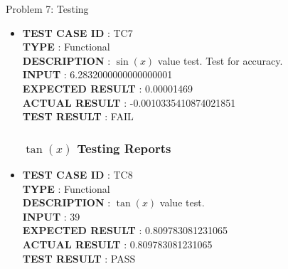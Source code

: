 \documentclass[a4paper,12pt]{article}
\begin{document}
\begin{section}{Problem 7: Testing}
\begin{itemize}
\item \textbf{TEST CASE ID} \hspace{1.25cm} : TC7  \\
\textbf{TYPE } \hspace{3.15cm}  : Functional\\
\textbf{DESCRIPTION }\hspace{1.25cm} : $\sin(x)$ value test. Test for accuracy. \\
\textbf{INPUT} \hspace{3.05cm} :  6.2832000000000000001 \\
\textbf{EXPECTED RESULT} \hspace{0.01cm} : 0.00001469 \\
\textbf{ACTUAL RESULT} \hspace{0.6cm} : -0.0010335410874021851 \\
\textbf{TEST RESULT} \hspace{1.40cm} : FAIL \\


\subsubsection{$\tan(x)$ Testing Reports}

\item \textbf{TEST CASE ID} \hspace{1.25cm} : TC8  \\
\textbf{TYPE } \hspace{3.15cm}  : Functional\\
\textbf{DESCRIPTION }\hspace{1.25cm} : $\tan(x)$ value test. \\
\textbf{INPUT} \hspace{3.05cm} :  39 \\
\textbf{EXPECTED RESULT} \hspace{0.01cm} : 0.809783081231065 \\
\textbf{ACTUAL RESULT} \hspace{0.6cm} : 0.809783081231065 \\
\textbf{TEST RESULT} \hspace{1.40cm} : PASS \\


\end{itemize}
\end{section}
\end{document}
